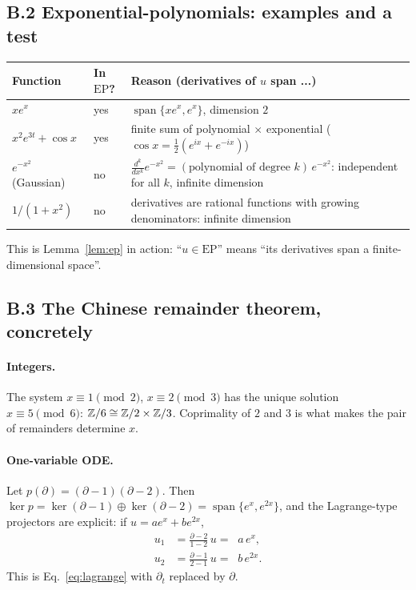 \documentclass[11pt,a4paper]{article}
\theoremstyle{definition}
\newcommand{\EP}{\mathrm{EP}}
\DeclareMathOperator{\spn}{span}
\begin{document}
\subsection*{B.2 Exponential-polynomials: examples and a test}
\begin{center}\small
\begin{tabular}{@{}L{5.4cm}L{2.3cm}L{6.8cm}@{}}
\toprule
Function & In $\EP$? & Reason (derivatives of $u$ span ...)\\\midrule
$xe^{x}$ & yes & $\spn\{xe^x,e^x\}$, dimension $2$\\
$x^2e^{3t}+\cos x$ & yes & finite sum of polynomial $\times$ exponential ($\cos x=\tfrac12(e^{ix}+e^{-ix})$)\\
$e^{-x^2}$ (Gaussian) & no & $\frac{d^k}{dx^k}e^{-x^2}=(\text{polynomial of degree }k)\,e^{-x^2}$: independent for all $k$, infinite dimension\\
$1/(1+x^2)$ & no & derivatives are rational functions with growing denominators: infinite dimension\\
\bottomrule
\end{tabular}
\end{center}
This is Lemma~\ref{lem:ep} in action: ``$u\in\EP$'' means ``its derivatives span a finite-dimensional space''.

\subsection*{B.3 The Chinese remainder theorem, concretely}
\paragraph{Integers.} The system $x\equiv1\pmod2$, $x\equiv2\pmod3$ has the unique solution $x\equiv5\pmod6$: $\mathbb{Z}/6\cong\mathbb{Z}/2\times\mathbb{Z}/3$. Coprimality of $2$ and $3$ is what makes the pair of remainders determine $x$.

\paragraph{One-variable ODE.} Let $p(\partial)=(\partial-1)(\partial-2)$. Then $\ker p=\ker(\partial-1)\oplus\ker(\partial-2)=\spn\{e^x,e^{2x}\}$, and the Lagrange-type projectors are explicit: if $u=ae^x+be^{2x}$,
\[
\begin{aligned}
u_1&=\frac{\partial-2}{1-2}\,u=\;\;a\,e^{x},\\
u_2&=\frac{\partial-1}{2-1}\,u=\;\;b\,e^{2x}.
\end{aligned}
\]
This is Eq.~\eqref{eq:lagrange} with $\partial_t$ replaced by $\partial$.
\end{document}

